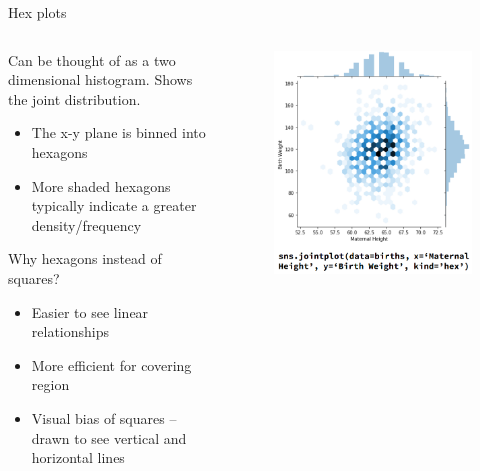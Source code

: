 \documentclass[aspectratio=169]{../latex_main/tntbeamer}  %
\begin{document}
	
	\begin{frame}{Hex plots}
	    \begin{columns}
            \begin{column}{.5\textwidth}
            Can be thought of as a two dimensional histogram. Shows the joint distribution.
            \begin{itemize}
                \item The x-y plane is binned into hexagons
                \item More shaded hexagons typically indicate a greater density/frequency
            \end{itemize}
            
            \bigskip
            Why hexagons instead of squares?
            \begin{itemize}
                \item Easier to see linear relationships
                \item More efficient for covering region
                \item \alert{Visual bias} of squares – drawn to see vertical and horizontal lines
            \end{itemize}
            \end{column}
            
            
            \begin{column}{.5\textwidth}
               \begin{figure}
                       \includegraphics[scale=.33]{Bild48}
                \end{figure}
            \end{column}
        \end{columns}
	\end{frame}
	
\end{document}
